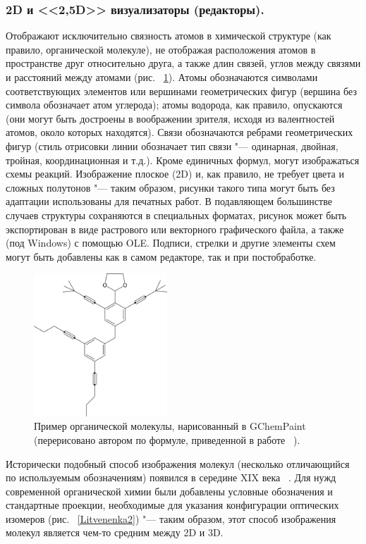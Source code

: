 \documentclass[10pt, a5paper]{article}
\begin{document}
\subsubsection*{2D и <<2,5D>> визуализаторы (редакторы).}

Отображают исключительно связность атомов в \linebreak химической структуре (как правило, органической молекуле), не отображая расположения атомов в пространстве друг относительно друга, а также длин связей, углов между связями и расстояний между атомами (рис. ~\ref{Litvenenka1}). Атомы обозначаются символами соответствующих элементов или вершинами геометрических фигур (вершина без символа обозначает атом углерода); атомы водорода, как правило, опускаются (они могут быть достроены в воображении зрителя, исходя из валентностей атомов, около которых находятся). Связи обозначаются ребрами геометрических фигур (стиль отрисовки линии обозначает тип связи "--- одинарная, двойная, тройная, координационная и т.д.). Кроме единичных формул, могут изображаться схемы реакций. Изображение плоское (2D) и, как правило, не требует цвета и сложных полутонов "--- таким образом, рисунки такого типа могут быть без адаптации использованы для печатных работ. В подавляющем большинстве случаев структуры сохраняются в специальных форматах, рисунок может быть экспортирован в виде растрового или векторного графического файла, а также (под Windows) с помощью OLE. Подписи, стрелки и другие элементы схем могут быть добавлены как в самом редакторе, так и при постобработке.


\begin{figure}[h!]
  \centering
  \includegraphics[width=5cm]{20_2016_Litvenenka1.png}
  \caption{Пример органической молекулы, нарисованный в GChemPaint (перерисовано автором по формуле, приведенной в работе ~\cite{Litvenenka1}).}
  \label{Litvenenka1}
\end{figure}

Исторически подобный способ изображения молекул (несколько отличающийся по используемым обозначениям) появился в середине XIX века ~\cite{Litvenenka2}. Для нужд современной органической химии были добавлены условные обозначения и стандартные проекции, необходимые для указания конфигурации оптических изомеров (рис. ~\ref{Litvenenka2}) "--- таким образом, этот способ изображения молекул является чем-то средним между 2D и 3D.
\end{document}
